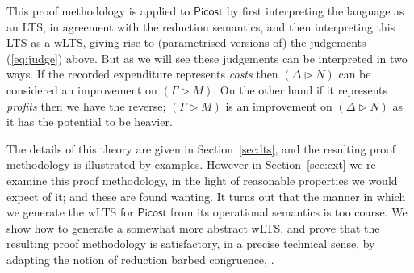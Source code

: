 \documentclass{LMCS}
\newcommand{\pfn}[1]{\mathsf{#1}}  \newcommand{\cfn}[1]{\mathsf{#1}}  \newcommand{\ownfnt}[1]{{\mathsf{#1}}}
\newcommand{\picost}{\ensuremath{\pfn{Picost}}\xspace}
\newcommand{\with}{\mathbin \rhd}
\begin{document}
This proof methodology is applied to \picost by first interpreting the
language as an LTS, in agreement with the reduction semantics, and
then interpreting this LTS as a wLTS, giving rise to (parametrised 
versions of) the judgements
(\ref{eq:judge}) above.  But as we will see these judgements can be
interpreted in two ways. If the recorded expenditure represents
\emph{costs} then $(\Delta \with N) $ can be considered an improvement
on $ (\Gamma \with M)$. On the other hand if it represents
\emph{profits} then we have the reverse; $ (\Gamma \with M)$ is an
improvement on $(\Delta \with N)$ as it has the potential to be
heavier.

The details of this theory are given in Section~\ref{sec:lts}, and the
resulting proof methodology is illustrated by examples.  However in
Section~\ref{sec:cxt} we re-examine this proof methodology, in the
light of reasonable properties we would expect of it; and these are
found wanting.  It turns out that the manner in which we generate the
wLTS for \picost from its operational semantics is too coarse. We
show how to generate a somewhat more abstract wLTS, and prove that the
resulting proof methodology is satisfactory, in a precise technical
sense,  by adapting the notion of reduction barbed congruence,
\cite{ht92,pibook,pityping,dpibook}.
\end{document}
